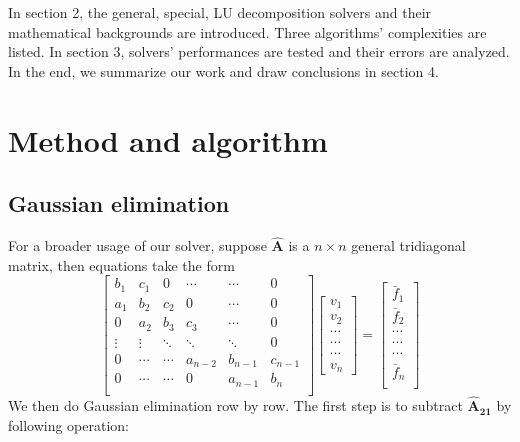 \documentclass[12pt]{article}
\begin{document}
In section 2, the general, special, LU decomposition solvers and their mathematical backgrounds are introduced. Three algorithms' complexities are listed. In section 3, solvers' performances are tested and their errors are analyzed. In the end, we summarize our work and draw conclusions in section 4.

\section{Method and algorithm}
\subsection{Gaussian elimination}
For a broader usage of our solver, suppose $\mathbf{\hat{A}}$ is a $n\times n$ general tridiagonal matrix, then equations take the form
\[   
\left[\begin{array}{cccccc}   
    b_1 &    c_1    & 0   & \cdots  & \cdots  & 0\\  
    a_1 &    b_2    & c_2  & 0       & \cdots  & 0\\
    0 &    a_2    & b_3  & c_3       & \cdots  & 0\\ 
    \vdots &    \vdots    & \ddots  & \ddots  & \ddots  & 0\\ 
    0 &    \cdots    & \cdots  & a_{n-2}       & b_{n-1}  & c_{n-1}\\ 
    0 &    \cdots    & \cdots  & 0       & a_{n-1}  & b_{n}\\ 
\end{array}\right]\left[\begin{array}{c}
     v_1\\    v_2\\ \cdots \\ \cdots\\ \cdots\\ v_{n}
 \end{array}\right] = \left[\begin{array}{c}
 \bar{f}_1 \\    \bar{f}_2   \\ \cdots\\ \cdots \\ \cdots \\ \bar{f}_n\\
 \end{array}\right]
\] 
We then do Gaussian elimination\cite{morten,sauer2012numerical} row by row. The first step is to subtract $\mathbf{\hat{A}_{21}}$ by following operation:
\end{document}
